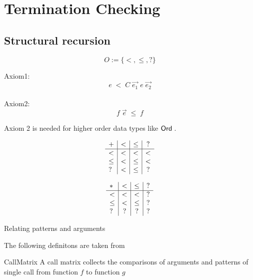 \chapter{Termination Checking}

\section{Structural recursion}

\begin{definition}[Order]
\[ O := \{ < , \leq , ? \} \]
\end{definition}
Axiom1:
\[ e \; < \; C \; \vec{e_1} \; e \; \vec{e_2} \]
\\
Axiom2:
\[ f \; \vec{e} \; \leq \; f \] 

Axiom 2 is needed for higher order data types like $\mathsf{Ord}\;$.

\begin{definition}
\[
\begin{array}{l | c |c | c }

 +    &  <   &  \leq   &  ? \\
 \hline 
 <    &  <   & <       &  < \\
 \leq &  <   & \leq    &  <  \\
 ?    &  <   & \leq    &  ?
\end{array}
\]

\end{definition}


\begin{definition}
\[
\begin{array}{l | c |c | c}
 *   &  <  &  \leq & ? \\
\hline
  <   & <    & <    &   ? \\
 \leq & <    & \leq &   ?  \\
 ?    & ?    & ?    &   ?
\end{array}
\]
\end{definition}

\begin{definition}{Relating patterns and arguments}
\end{definition}

The following definitons are taken from \cite{abelAltenkirch:predStRec}

\begin{definition}
CallMatrix
A call matrix collects the comparisons of arguments and patterns of single call from function $f$ to function $g$
\end{definition}

